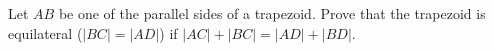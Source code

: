 Let $AB$ be one of the parallel sides of a trapezoid. Prove that the trapezoid is equilateral ($|BC| = |AD|$) if $|AC| + |BC| = |AD| + |BD|$.

